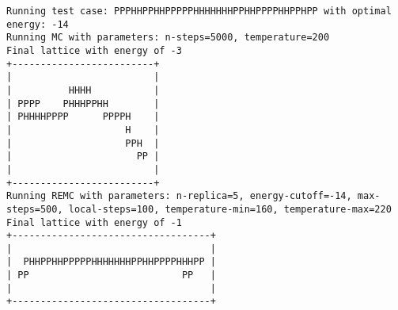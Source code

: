 \begin{appendices}
\begin{verbatim}
Running test case: PPPHHPPHHPPPPPHHHHHHHPPHHPPPPHHPPHPP with optimal energy: -14
Running MC with parameters: n-steps=5000, temperature=200
Final lattice with energy of -3
+-------------------------+
|                         |
|          HHHH           |
| PPPP    PHHHPPHH        |
| PHHHHPPPP      PPPPH    |
|                    H    |
|                    PPH  |
|                      PP |
|                         |
+-------------------------+
Running REMC with parameters: n-replica=5, energy-cutoff=-14, max-steps=500, local-steps=100, temperature-min=160, temperature-max=220
Final lattice with energy of -1
+-----------------------------------+
|                                   |
|  PHHPPHHPPPPPHHHHHHHPPHHPPPPHHHPP |
| PP                           PP   |
|                                   |
+-----------------------------------+
\end{verbatim}

\end{appendices}